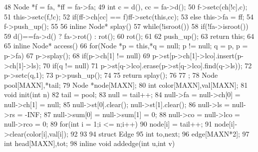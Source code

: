 \documentclass[11pt]{article}
\begin{document}
\begin{Code}
{{48              Node *f = fa, *ff = fa->fa;
49              int c = d(), cc = fa->d();
50              f->setc(ch[!c],c);
51              this->setc(f,!c);
52              if(ff->ch[cc] == f)ff->setc(this,cc);
53              else this->fa = ff;
54              f->push_up();
55       }
56       inline Node* splay(){
57           while(!isroot()){
58               if(!fa->isroot())
59                   d()==fa->d() ? fa->rot() : rot();
60               rot();
61           }
62           push_up();
63           return this;
64       }
65       inline Node* access(){
66           for(Node *p = this,*q = null; p != null; q = p, p = p->fa){
67               p->splay();
68               if(p->ch[1] != null)
69                   p->st[p->ch[1]->lco].insert(p->ch[1]->ls);
70               if(q != null)
71                   p->st[q->lco].erase(p->st[q->lco].find(q->ls));
72               p->setc(q,1);
73               p->push_up();
74           }
75           return splay();
76       }
77   };
78   Node pool[MAXN],*tail;
79   Node *node[MAXN];
80   int color[MAXN],val[MAXN];
81   void init(int n){
82       tail = pool;
83       null = tail++;
84       null->fa = null->ch[0] = null->ch[1] = null;
85       null->st[0].clear(); null->st[1].clear();
86       null->ls = null->rs = -INF;
87       null->sum[0] = null->sum[1] = 0;
88       null->co = null->lco = null->rco = 0;
89       for(int i = 1;i <= n;i++){
90           node[i] = tail++;
91           node[i]->clear(color[i],val[i]);
92       }
93   }
94   struct Edge{
95       int to,next;
96   }edge[MAXN*2];
97   int head[MAXN],tot;
98   inline void addedge(int u,int v){


}
\end{Code}
\end{document}
